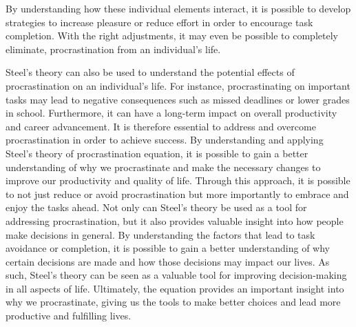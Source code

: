 By understanding how these individual elements interact,
it is possible to develop strategies to increase pleasure or reduce
effort in order to encourage task completion.
With the right adjustments, it may even be possible to completely eliminate,
procrastination from an individual’s life. \cite{Steel2007}

Steel's theory can also be used to understand the potential effects of procrastination on an individual's life.
For instance, procrastinating on important tasks may lead to negative consequences such as missed deadlines or lower grades in school.
Furthermore, it can have a long-term impact on overall productivity and career advancement.
It is therefore essential to address and overcome procrastination in order to achieve success.
By understanding and applying Steel’s theory of procrastination equation, it is possible to gain a better understanding
of why we procrastinate and make the necessary changes to improve our productivity and quality of life.  Through this approach,
it is possible to not just reduce or avoid procrastination but more importantly to embrace and enjoy the tasks ahead.
Not only can Steel’s theory be used as a tool for addressing procrastination, but it also provides valuable insight into
how people make decisions in general. By understanding the factors that lead to task avoidance or completion,
it is possible to gain a better understanding of why certain decisions are made and how those decisions may impact our lives.
As such, Steel’s theory can be seen as a valuable tool for improving decision-making in all aspects of life.
Ultimately, the equation provides an important insight into why we procrastinate,
giving us the tools to make better choices and lead more productive and fulfilling lives.



